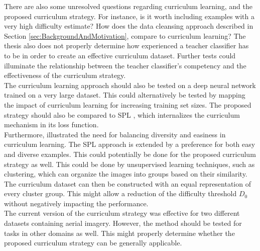 There are also some unresolved questions regarding curriculum learning, and the proposed curriculum strategy. For instance, is it worth including examples with a very high difficulty estimate? How does the data cleansing approach described in Section \ref{sec:BackgroundAndMotivation}, compare to curriculum learning? The thesis also does not properly determine how experienced a teacher classifier has to be in order to create an effective curriculum dataset. Further tests could illuminate the relationship between the teacher classifier's competency and the effectiveness of the curriculum strategy.  \\

The curriculum learning approach should also be tested on a deep neural network trained on a very large dataset. This could alternatively be tested by mapping the impact of curriculum learning for increasing training set sizes. The proposed strategy should also be compared to \ac{SPL} \citep{Kumar_self_paced_learning}, which internalizes the curriculum mechanism in its loss function.\\

Furthermore, \cite{Lu_self-paced_learning_diversity} illustrated the need for balancing diversity and easiness in curriculum learning. The \ac{SPL} approach is extended by a preference for both easy and diverse examples. This could potentially be done for the proposed curriculum strategy as well. This could be done by unsupervised learning techniques, such as clustering, which can organize the images into groups based on their similarity. The curriculum dataset can then be constructed with an equal representation of every cluster group. This might allow a reduction of the difficulty threshold $D_0$ without negatively impacting the performance.\\

The current version of the curriculum strategy was effective for two different datasets containing aerial imagery. However, the method should be tested for tasks in other domains as well. This might properly determine whether the proposed curriculum strategy can be generally applicable.\\
 


